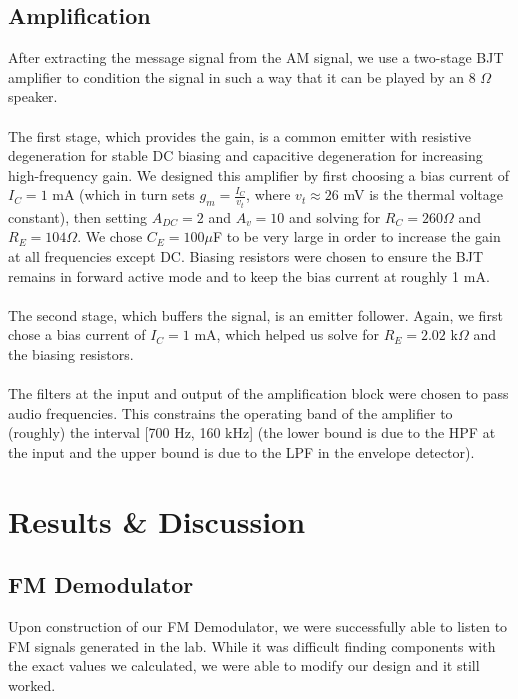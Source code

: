 \documentclass[11pt]{article}
\begin{document}
    \subsection{Amplification}
    After extracting the message signal from the AM signal, we use a two-stage BJT amplifier to condition the signal in such a way that it can be played by an 8 $\Omega$ speaker.\\
    \\
    The first stage, which provides the gain, is a common emitter with resistive degeneration for stable DC biasing and capacitive degeneration for increasing high-frequency gain. We designed this amplifier by first choosing a bias current of $I_C = 1$ mA (which in turn sets $g_m = \frac{I_C}{v_t}$, where $v_t \approx 26$ mV is the thermal voltage constant), then setting $A_{DC} = 2$ and $A_{v} = 10$ and solving for $R_C = 260 \Omega$ and $R_E = 104 \Omega$. We chose $C_E = 100 \mu$F to be very large in order to increase the gain at all frequencies except DC. Biasing resistors were chosen to ensure the BJT remains in forward active mode and to keep the bias current at roughly 1 mA. \\
    \\
    The second stage, which buffers the signal, is an emitter follower.  Again, we first chose a bias current of $I_C = 1$ mA, which helped us solve for $R_E = 2.02$ k$\Omega$ and the biasing resistors. \\
    \\
    The filters at the input and output of the amplification block were chosen to pass audio frequencies. This constrains the operating band of the amplifier to (roughly) the interval [700 Hz, 160 kHz] (the lower bound is due to the HPF at the input and the upper bound is due to the LPF in the envelope detector).

\section{Results \& Discussion}

    \subsection{FM Demodulator}
    Upon construction of our FM Demodulator, we were successfully able to listen to FM signals generated in the lab. While it was difficult finding components with the exact values we calculated, we were able to modify our design and it still worked.
    
\end{document}
